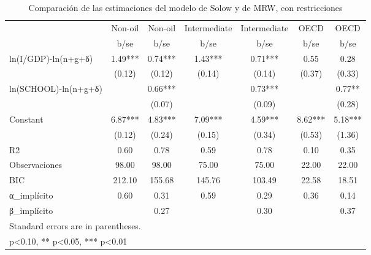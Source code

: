 \begin{table}[htbp]\centering
\def\sym#1{\ifmmode^{#1}\else\(^{#1}\)\fi}
\caption{Comparación de las estimaciones del modelo de Solow y de MRW, con restricciones}
\begin{tabular}{l*{6}{c}}
\hline\hline
                    &\multicolumn{1}{c}{Non-oil}&\multicolumn{1}{c}{Non-oil}&\multicolumn{1}{c}{Intermediate}&\multicolumn{1}{c}{Intermediate}&\multicolumn{1}{c}{OECD}&\multicolumn{1}{c}{OECD}\\
                    &        b/se   &        b/se   &        b/se   &        b/se   &        b/se   &        b/se   \\
\hline
ln(I/GDP)-ln(n+g+δ) &        1.49***&        0.74***&        1.43***&        0.71***&        0.55   &        0.28   \\
                    &      (0.12)   &      (0.12)   &      (0.14)   &      (0.14)   &      (0.37)   &      (0.33)   \\
ln(SCHOOL)-ln(n+g+δ)&               &        0.66***&               &        0.73***&               &        0.77** \\
                    &               &      (0.07)   &               &      (0.09)   &               &      (0.28)   \\
Constant            &        6.87***&        4.83***&        7.09***&        4.59***&        8.62***&        5.18***\\
                    &      (0.12)   &      (0.24)   &      (0.15)   &      (0.34)   &      (0.53)   &      (1.36)   \\
\hline
R2                  &        0.60   &        0.78   &        0.59   &        0.78   &        0.10   &        0.35   \\
Observaciones       &       98.00   &       98.00   &       75.00   &       75.00   &       22.00   &       22.00   \\
BIC                 &      212.10   &      155.68   &      145.76   &      103.49   &       22.58   &       18.51   \\
α\_implícito         &        0.60   &        0.31   &        0.59   &        0.29   &        0.36   &        0.14   \\
β\_implícito         &               &        0.27   &               &        0.30   &               &        0.37   \\
\hline\hline
\multicolumn{7}{l}{\footnotesize Standard errors are in parentheses.}\\
\multicolumn{7}{l}{\footnotesize * p<0.10, ** p<0.05, *** p<0.01}\\
\end{tabular}
\end{table}
